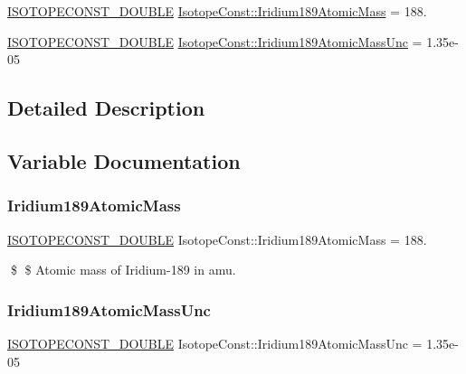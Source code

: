 \begin{DoxyCompactItemize}
\item 
\mbox{\hyperlink{group___isotope_const-_macros_ga8f45a7272ce02c0b4c65c44636ed719a}{I\+S\+O\+T\+O\+P\+E\+C\+O\+N\+S\+T\+\_\+\+D\+O\+U\+B\+LE}} \mbox{\hyperlink{group___isotope_const-_iridium-_ir189_ga42dc0e6191c6e04402ff19c6fd4c66e7}{Isotope\+Const\+::\+Iridium189\+Atomic\+Mass}} = 188.
\item 
\mbox{\hyperlink{group___isotope_const-_macros_ga8f45a7272ce02c0b4c65c44636ed719a}{I\+S\+O\+T\+O\+P\+E\+C\+O\+N\+S\+T\+\_\+\+D\+O\+U\+B\+LE}} \mbox{\hyperlink{group___isotope_const-_iridium-_ir189_ga6e478d7bc0ed36190a8a7dd9392a22ec}{Isotope\+Const\+::\+Iridium189\+Atomic\+Mass\+Unc}} = 1.\+35e-\/05
\end{DoxyCompactItemize}


\subsection{Detailed Description}


\subsection{Variable Documentation}
\mbox{\label{group___isotope_const-_iridium-_ir189_ga42dc0e6191c6e04402ff19c6fd4c66e7}} 
\subsubsection{\texorpdfstring{Iridium189\+Atomic\+Mass}{Iridium189AtomicMass}}
{\footnotesize\ttfamily \mbox{\hyperlink{group___isotope_const-_macros_ga8f45a7272ce02c0b4c65c44636ed719a}{I\+S\+O\+T\+O\+P\+E\+C\+O\+N\+S\+T\+\_\+\+D\+O\+U\+B\+LE}} Isotope\+Const\+::\+Iridium189\+Atomic\+Mass = 188.}

\$ \$ Atomic mass of Iridium-\/189 in amu. \mbox{\label{group___isotope_const-_iridium-_ir189_ga6e478d7bc0ed36190a8a7dd9392a22ec}} 
\subsubsection{\texorpdfstring{Iridium189\+Atomic\+Mass\+Unc}{Iridium189AtomicMassUnc}}
{\footnotesize\ttfamily \mbox{\hyperlink{group___isotope_const-_macros_ga8f45a7272ce02c0b4c65c44636ed719a}{I\+S\+O\+T\+O\+P\+E\+C\+O\+N\+S\+T\+\_\+\+D\+O\+U\+B\+LE}} Isotope\+Const\+::\+Iridium189\+Atomic\+Mass\+Unc = 1.\+35e-\/05}

